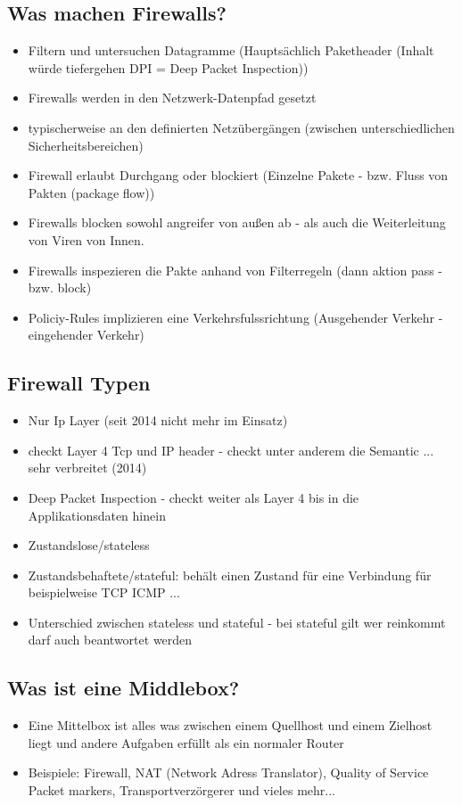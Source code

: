 \documentclass[a4paper,10pt]{scrartcl}
\begin{document}
 \subsection{Was machen Firewalls? }
 \begin{itemize}
  \item Filtern und untersuchen Datagramme (Hauptsächlich Paketheader (Inhalt würde tiefergehen DPI = Deep Packet Inspection))
  \item Firewalls werden in den Netzwerk-Datenpfad gesetzt
  \item typischerweise an den definierten Netzübergängen (zwischen unterschiedlichen Sicherheitsbereichen)
  \item Firewall erlaubt Durchgang oder blockiert (Einzelne Pakete - bzw. Fluss von Pakten (package flow))
  \item Firewalls blocken sowohl angreifer von außen ab - als auch die Weiterleitung von Viren von Innen.
  \item Firewalls inspezieren die Pakte anhand von Filterregeln (dann aktion pass - bzw. block)
  \item Policiy-Rules implizieren eine Verkehrsfulssrichtung (Ausgehender Verkehr - eingehender Verkehr)
 \end{itemize}

  \subsection{Firewall Typen }
 \begin{itemize}
  \item Nur Ip Layer (seit 2014 nicht mehr im Einsatz)
  \item checkt Layer 4 Tcp und IP header - checkt unter anderem die Semantic ... sehr verbreitet (2014)
  \item Deep Packet Inspection - checkt weiter als Layer 4 bis in die Applikationsdaten hinein
  \item Zustandslose/stateless
  \item Zustandsbehaftete/stateful: behält einen Zustand für eine Verbindung für beispielweise TCP ICMP ...
  \item Unterschied zwischen stateless und stateful - bei stateful gilt wer reinkommt darf auch beantwortet werden
  \end{itemize}

  \subsection{Was ist eine Middlebox? }
  \begin{itemize}

  \item Eine Mittelbox ist alles was zwischen einem Quellhost und einem Zielhost liegt und andere Aufgaben erfüllt als ein normaler Router
  \item Beispiele: Firewall, NAT (Network Adress Translator), Quality of Service Packet markers, Transportverzörgerer und vieles mehr...
  \end{itemize}
  
\end{document}
